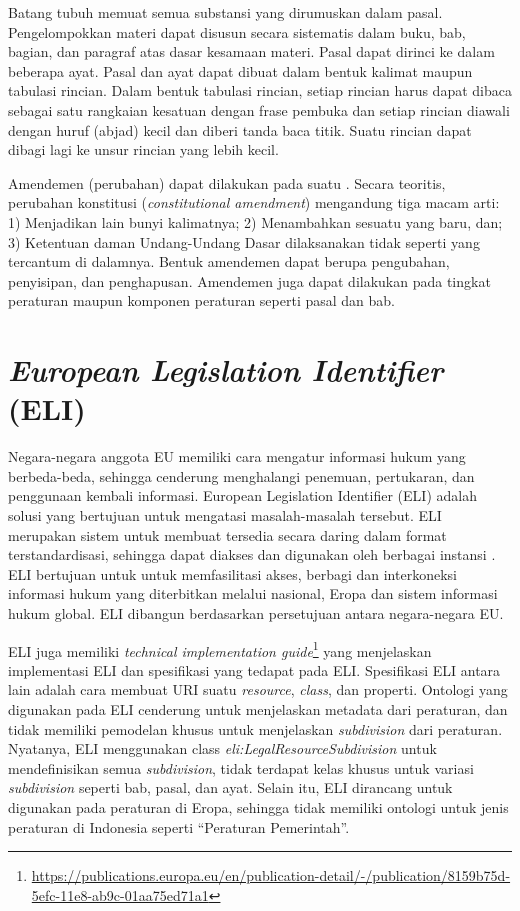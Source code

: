 Batang tubuh \legal memuat semua substansi \legal yang dirumuskan dalam pasal. Pengelompokkan materi
\legal dapat disusun secara sistematis dalam buku, bab, bagian, dan paragraf atas dasar kesamaan
materi. Pasal dapat dirinci ke dalam beberapa ayat. Pasal dan ayat dapat dibuat dalam bentuk kalimat
maupun tabulasi rincian. Dalam bentuk tabulasi rincian, setiap rincian harus dapat dibaca sebagai
satu rangkaian kesatuan dengan frase pembuka dan setiap rincian diawali dengan huruf (abjad) kecil
dan diberi tanda baca titik. Suatu rincian dapat dibagi lagi ke unsur rincian yang lebih kecil.

Amendemen (perubahan) dapat dilakukan pada suatu \legal. Secara teoritis, perubahan konstitusi
(\textit{constitutional amendment}) mengandung tiga macam arti: 1) Menjadikan lain bunyi kalimatnya;
2) Menambahkan sesuatu yang baru, dan; 3) Ketentuan daman Undang-Undang Dasar dilaksanakan tidak
seperti yang tercantum di dalamnya\citep{teori_amandemen}. Bentuk amendemen dapat berupa pengubahan,
penyisipan, dan penghapusan. Amendemen juga dapat dilakukan pada tingkat peraturan maupun komponen
peraturan seperti pasal dan bab.

\section{\textit{European Legislation Identifier} (ELI)}
\label{sec:eli}

Negara-negara anggota EU memiliki cara mengatur informasi hukum yang berbeda-beda, sehingga
cenderung menghalangi penemuan, pertukaran, dan penggunaan kembali informasi. European Legislation
Identifier (ELI) adalah solusi yang bertujuan untuk mengatasi masalah-masalah tersebut. ELI
merupakan sistem untuk membuat \legal tersedia secara daring dalam format terstandardisasi, sehingga
dapat diakses dan digunakan oleh berbagai instansi \citep{eli}. ELI bertujuan untuk untuk
memfasilitasi akses, berbagi dan interkoneksi informasi hukum yang diterbitkan melalui nasional,
Eropa dan sistem informasi hukum global. ELI dibangun berdasarkan persetujuan antara negara-negara
EU.

ELI juga memiliki \textit{technical implementation
  guide}\footnote{\url{https://publications.europa.eu/en/publication-detail/-/publication/8159b75d-5efc-11e8-ab9c-01aa75ed71a1}}
yang menjelaskan implementasi ELI dan spesifikasi yang tedapat pada ELI. Spesifikasi ELI antara lain
adalah cara membuat URI suatu \textit{resource}, \textit{class}, dan properti. Ontologi yang
digunakan pada ELI cenderung untuk menjelaskan metadata dari peraturan, dan tidak memiliki pemodelan
khusus untuk menjelaskan \textit{subdivision} dari peraturan. Nyatanya, ELI menggunakan class
\textit{eli:LegalResourceSubdivision} untuk mendefinisikan semua \textit{subdivision}, tidak
terdapat kelas khusus untuk variasi \textit{subdivision} seperti bab, pasal, dan ayat. Selain itu,
ELI dirancang untuk digunakan pada peraturan di Eropa, sehingga tidak memiliki ontologi untuk jenis
peraturan di Indonesia seperti ``Peraturan Pemerintah''.


